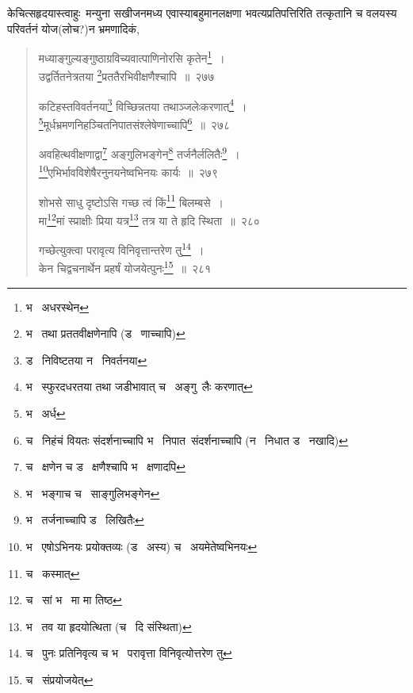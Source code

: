 \documentclass[11pt, openany]{book}
\begin{document}
केचित्सहृदयास्त्वाहुः\textendash\ मन्युना सखीजनमध्य एवास्याबहुमानलक्षणा भवत्यप्रतिपत्तिरिति तत्कृतानि च वलयस्य परिवर्तनं योज(लोच?)न भ्रमणादिकं,

\newpage

\begin{quote}
{\na मध्याङ्गुल्यङ्गुष्ठाग्रविच्यवात्पाणिनोरसि कृतेन\renewcommand{\thefootnote}{1}\footnote{भ \textendash\  अधरस्थेन}~।\\
उद्वर्तितनेत्रतया \renewcommand{\thefootnote}{2}\footnote{भ \textendash\  तथा प्रततवीक्षणेनापि (ड \textendash\  णाच्चापि)}प्रततैरभिवीक्षणैश्चापि~॥~२७७ 

कटिहस्तविवर्तनया\renewcommand{\thefootnote}{3}\footnote{ड \textendash\  निविष्टतया न \textendash\  निवर्तनया} विच्छिन्नतया तथाञ्जलेःकरणात्\renewcommand{\thefootnote}{4}\footnote{भ \textendash\  स्फुरदधरतया तथा जडीभावात् च \textendash\  अङ्गु\textendash\ लैः करणात्}~।\\
\renewcommand{\thefootnote}{5}\footnote{भ \textendash\  अर्ध}मूर्धभ्रमणनिहञ्चितनिपातसंश्लेषेणाच्चापि\renewcommand{\thefootnote}{6}\footnote{च \textendash\  निहंचं वियतः संदर्शनाच्चापि भ \textendash\  निपात\textendash\  संदर्शनाच्चापि (न \textendash\  निधात ड \textendash\  नखादि)}~॥~२७८

अवहित्थवीक्षणाद्वा\renewcommand{\thefootnote}{7}\footnote{च \textendash\  क्षणेन च ड \textendash\  क्षणैश्चापि भ \textendash\  क्षणादपि} अङ्गुलिभङ्गेन\renewcommand{\thefootnote}{8}\footnote{भ \textendash\  भङ्गाच च \textendash\  साङ्गुलिभङ्गेन} तर्जनैर्ललितैः\renewcommand{\thefootnote}{9}\footnote{भ \textendash\  तर्जनाच्चापि ड \textendash\  लिखितैः}~।\\
\renewcommand{\thefootnote}{10}\footnote{भ \textendash\  एषोऽभिनयः प्रयोक्तव्यः (ड \textendash\  अस्य) च \textendash\  अयमेतेष्वभिनयः}एभिर्भावविशेषैरनुनयनेष्वभिनयः कार्यः~॥~२७९ 

शोभसे साधु दृष्टोऽसि गच्छ त्वं किं\renewcommand{\thefootnote}{11}\footnote{च \textendash\  कस्मात्} बिलम्बसे~।\\
मा\renewcommand{\thefootnote}{12}\footnote{च \textendash\  सां भ \textendash\  मा मा तिष्ठ}मां स्प्राक्षीः प्रिया यत्र\renewcommand{\thefootnote}{13}\footnote{भ \textendash\  तव या हृदयोत्थिता (च \textendash\  दि संस्थिता)} तत्र या ते हृदि स्थिता~॥~२८० 

गच्छेत्युक्त्वा परावृत्य विनिवृत्तान्तरेण तु\renewcommand{\thefootnote}{14}\footnote{च \textendash\  पुनः प्रतिनिवृत्य च भ \textendash\  परावृत्ता विनिवृत्योत्तरेण तु}~।\\
केन चिद्वचनार्थेन प्रहर्षं योजयेत्पुनः\renewcommand{\thefootnote}{15}\footnote{च \textendash\  संप्रयोजयेत्}~॥~२८१}
\end{quote}
\end{document}
